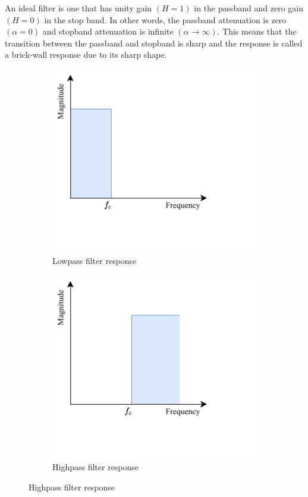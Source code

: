 An ideal filter is one that has unity gain $(H=1)$ in the passband and zero gain $(H=0)$ in the stop band. In other words, the passband attenuation is zero $(\alpha=0)$ and stopband attenuation is infinite $(\alpha\rightarrow\infty)$. This means that the transition between the passband and stopband is sharp and the response is called a brick-wall response due to its sharp shape.
\begin{figure}[H]
    \begin{subfigure}{0.48\textwidth}
        \centering
        \includegraphics[width=0.7\linewidth]{../Figures/idealized_lp}
        \caption{Lowpass filter response}
        \label{fig:ideal-a}
    \end{subfigure}
    \begin{subfigure}{0.48\textwidth}
        \centering
        \includegraphics[width=0.7\linewidth]{../Figures/idealized_hp}
        \caption{Highpass filter response}

\end{subfigure}
\end{figure}
